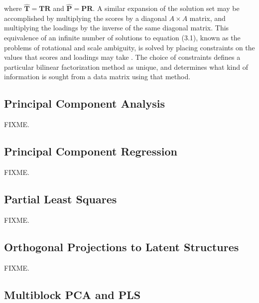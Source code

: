 \begin{doublespace}
where $\hat{\mathbf{T}} = \mathbf{T} \mathbf{R}$ and
$\hat{\mathbf{P}} = \mathbf{P} \mathbf{R}$. A similar expansion of the solution
set may be accomplished by multiplying the scores by a diagonal $A \times A$
matrix, and multiplying the loadings by the inverse of the same diagonal
matrix. This equivalence of an infinite number of solutions to equation (3.1),
known as the problems of rotational and scale ambiguity, is solved by placing
constraints on the values that scores and loadings may take
\cite{dejuan:aca1997,jolliffe2002}. The choice of constraints defines a
particular bilinear factorization method as unique, and determines what
kind of information is sought from a data matrix using that method.
\end{doublespace}

\subsection{Principal Component Analysis}

\begin{doublespace}
FIXME.
\end{doublespace}

\subsection{Principal Component Regression}

\begin{doublespace}
FIXME.
\end{doublespace}

\subsection{Partial Least Squares}

\begin{doublespace}
FIXME.
\end{doublespace}

\subsection{Orthogonal Projections to Latent Structures}

\begin{doublespace}
FIXME.
\end{doublespace}

\subsection{Multiblock PCA and PLS}


